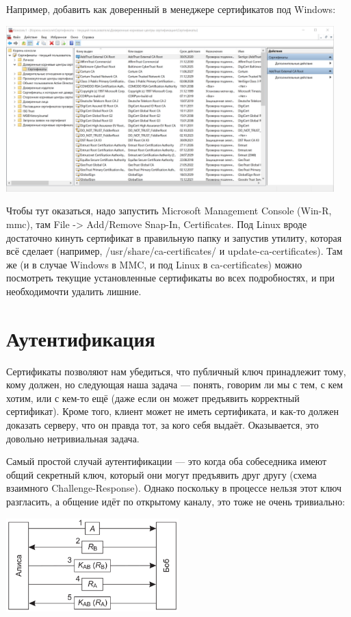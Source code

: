 \documentclass{../mcstext}
\begin{document}
Например, добавить как доверенный в менеджере сертификатов под Windows:

\begin{center}
    \includegraphics[width=0.95\textwidth]{windowsCertManager.png}
\end{center}

Чтобы тут оказаться, надо запустить Microsoft Management Console (Win-R, mmc), там File -> Add/Remove Snap-In, Certificates. Под Linux вроде достаточно кинуть сертификат в правильную папку и запустив утилиту, которая всё сделает (например, /usr/share/ca-certificates/ и update-ca-certificates). Там же (и в случае Windows в MMC, и под Linux в ca-certificates) можно посмотреть текущие установленные сертификаты во всех подробностях, и при необходимочти удалить лишние.

\section{Аутентификация}

Сертификаты позволяют нам убедиться, что публичный ключ принадлежит тому, кому должен, но следующая наша задача --- понять, говорим ли мы с тем, с кем хотим, или с кем-то ещё (даже если он может предъявить корректный сертификат). Кроме того, клиент может не иметь сертификата, и как-то должен доказать серверу, что он правда тот, за кого себя выдаёт. Оказывается, это довольно нетривиальная задача.

Самый простой случай аутентификации --- это когда оба собеседника имеют общий секретный ключ, который они могут предъявить друг другу (схема взаимного Challenge-Response). Однако поскольку в процессе нельзя этот ключ разгласить, а общение идёт по открытому каналу, это тоже не очень тривиально:

\begin{center}
    \includegraphics[width=0.5\textwidth]{challengeResponse.png}
\end{center}
\end{document}
